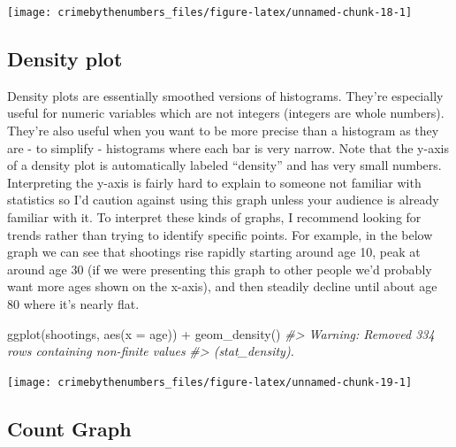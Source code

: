 \documentclass[
]{krantz}
\makeatletter
\newenvironment{Shaded}{\begin{snugshade}}{\end{snugshade}}
\newcommand{\AttributeTok}[1]{\textcolor[rgb]{0.61,0.61,0.61}{#1}}
\newcommand{\CommentTok}[1]{\textcolor[rgb]{0.37,0.37,0.37}{\textit{#1}}}
\newcommand{\FunctionTok}[1]{\textcolor[rgb]{0,0,0}{#1}}
\newcommand{\NormalTok}[1]{#1}
\newcommand{\SpecialCharTok}[1]{\textcolor[rgb]{0,0,0}{#1}}
\newenvironment{kframe}{%
\medskip{}
\setlength{\fboxsep}{.8em}
 \def\at@end@of@kframe{}%
 \ifinner\ifhmode%
  \def\at@end@of@kframe{\end{minipage}}%
  \begin{minipage}{\columnwidth}%
 \fi\fi%
 \def\FrameCommand##1{\hskip\@totalleftmargin \hskip-\fboxsep
 \colorbox{shadecolor}{##1}\hskip-\fboxsep
     \hskip-\linewidth \hskip-\@totalleftmargin \hskip\columnwidth}%
 \MakeFramed {\advance\hsize-\width
   \@totalleftmargin\z@ \linewidth\hsize
   \@setminipage}}%
 {\par\unskip\endMakeFramed%
 \at@end@of@kframe}
\renewenvironment{Shaded}{\begin{kframe}}{\end{kframe}}
\makeatother
\begin{document}
\begin{center}\texttt{[image: crimebythenumbers\_files/figure-latex/unnamed-chunk-18-1]} \end{center}

\hypertarget{density-plot}{%
\subsection{Density plot}\label{density-plot}}

Density plots are essentially smoothed versions of histograms. They're especially useful for numeric variables which are not integers (integers are whole numbers). They're also useful when you want to be more precise than a histogram as they are - to simplify - histograms where each bar is very narrow. Note that the y-axis of a density plot is automatically labeled ``density'' and has very small numbers. Interpreting the y-axis is fairly hard to explain to someone not familiar with statistics so I'd caution against using this graph unless your audience is already familiar with it. To interpret these kinds of graphs, I recommend looking for trends rather than trying to identify specific points. For example, in the below graph we can see that shootings rise rapidly starting around age 10, peak at around age 30 (if we were presenting this graph to other people we'd probably want more ages shown on the x-axis), and then steadily decline until about age 80 where it's nearly flat.

\begin{Shaded}
\begin{Highlighting}[]
\FunctionTok{ggplot}\NormalTok{(shootings, }\FunctionTok{aes}\NormalTok{(}\AttributeTok{x =}\NormalTok{ age)) }\SpecialCharTok{+} \FunctionTok{geom\_density}\NormalTok{()}
\CommentTok{\#\textgreater{} Warning: Removed 334 rows containing non{-}finite values}
\CommentTok{\#\textgreater{} (stat\_density).}
\end{Highlighting}
\end{Shaded}

\begin{center}\texttt{[image: crimebythenumbers\_files/figure-latex/unnamed-chunk-19-1]} \end{center}

\hypertarget{count-graph}{%
\subsection{Count Graph}\label{count-graph}}
\end{document}

